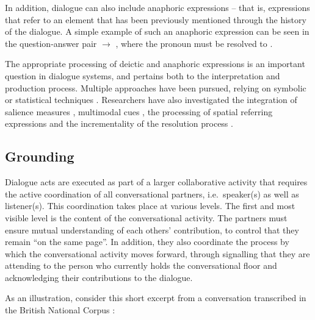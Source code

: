 In addition, dialogue can also include anaphoric expressions -- that is, expressions that refer to an element that has been previously mentioned through the history of the dialogue. A simple example of such an anaphoric expression can be seen in the question-answer pair  $\rightarrow$ , where the pronoun  must be resolved to . 

The appropriate processing of deictic and anaphoric expressions is an important question in dialogue systems, and pertains both to the interpretation and production process. Multiple approaches have been pursued, relying on symbolic \citep{Eckert2000} or statistical techniques \citep{StrubeM03,Stent2010}.  Researchers have also investigated the integration of salience measures \citep{Kelleher:2004}, multimodal cues \citep{Frampton:2009,Chen:2011}, the processing of spatial referring expressions \citep{zender/etal:2009-ijcai} and the incrementality of the resolution process \citep{schlangen2009incremental,poesio2011incremental}. 

\subsection{Grounding}

Dialogue acts are executed as part of a larger collaborative activity that requires the active coordination of all conversational partners, i.e.\ speaker(s) as well as listener(s).  This coordination takes place at various levels.  The first and most visible level is the content of the conversational activity.   The partners must ensure mutual understanding of each others' contribution, to control that they remain ``on the same page''.  In addition, they also coordinate the process by which the conversational activity moves forward, through signalling that they are attending to the person who currently holds the conversational floor and acknowledging their contributions to the dialogue.

As an illustration, consider this short excerpt from a conversation transcribed in the British National Corpus \citep{bnc}:

